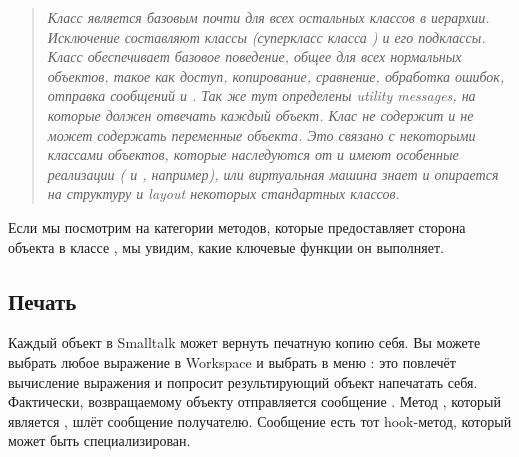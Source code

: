 \documentclass[a4paper,10pt,twoside]{book}
\begin{document}
\begin{quote}
\textit{
Класс  является базовым почти для всех остальных классов в иерархии. Исключение составляют классы  (суперкласс класса ) и его подклассы.
Класс  обеспечивает базовое поведение, общее для всех нормальных объектов, такое как доступ, копирование, сравнение, обработка ошибок, отправка сообщений и . Так же тут определены utility messages, на которые должен отвечать каждый объект.
Клас  не содержит и не может содержать переменные объекта. Это связано с некоторыми классами объектов, которые наследуются от  и имеют особенные реализации ( и , например), или виртуальная машина знает и опирается на структуру и layout некоторых стандартных классов.
}\end{quote}

Если мы посмотрим на категории методов, которые предоставляет сторона объекта в классе , мы увидим, какие ключевые функции он выполняет.

\subsection{Печать}
Каждый объект в Smalltalk может вернуть печатную копию себя. Вы можете выбрать любое выражение в Workspace и выбрать в меню : это повлечёт вычисление выражения и попросит результирующий объект напечатать себя. Фактически, возвращаемому объекту отправляется сообщение . Метод , который является , шлёт сообщение  получателю. Сообщение  есть тот hook-метод, который может быть специализирован.
\end{document}
